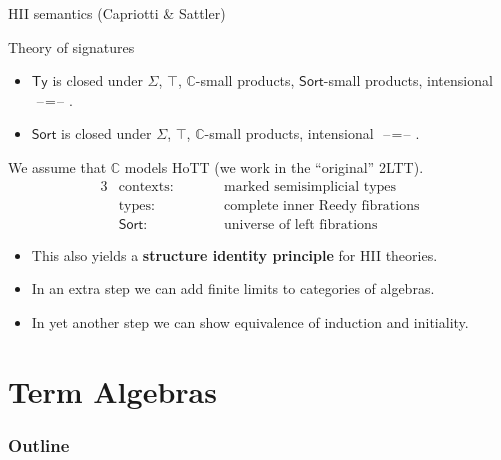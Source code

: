 \documentclass[dvipsnames]{beamer}
\newcommand{\mbb}[1]{\mathbb{#1}}
\newcommand{\Ty}{\mathsf{Ty}}
\newcommand{\blank}{\mathord{\hspace{1pt}\text{--}\hspace{1pt}}}
\newcommand{\Sort}{\mathsf{Sort}}
\newcommand{\mbbC}{\mbb{C}}
\begin{document}
\begin{frame}{HII semantics (Capriotti \& Sattler)}

\begin{block}{Theory of signatures}
  \begin{itemize}
  \item $\Ty$ is closed under $\Sigma$, $\top$, $\mbbC$-small products, $\Sort$-small products,
        intensional $\blank\!=\!\blank$.
    \item $\Sort$ is closed under $\Sigma$, $\top$, $\mbbC$-small products, intensional $\blank\!=\!\blank$.
  \end{itemize}
\end{block}

We assume that $\mbbC$ models HoTT (we work in the ``original'' 2LTT).
\begin{alignat*}{3}
  & \text{contexts:}\hspace{2em}      && \text{marked semisimplicial types}\\
  & \text{types:}                     && \text{complete inner Reedy fibrations}\\
  & \text{$\Sort$:}                   && \text{universe of left fibrations}
\end{alignat*}
\vspace{-1.5em}
\begin{itemize}
  \item This also yields a \textbf{structure identity principle} for HII theories.
  \item In an extra step we can add finite limits to categories of algebras.
  \item In yet another step we can show equivalence of induction and initiality.
\end{itemize}


\end{frame}

\section{Term Algebras}
\begin{frame}
  \frametitle{Outline}
  \tableofcontents[currentsection]
\end{frame}
\end{document}
